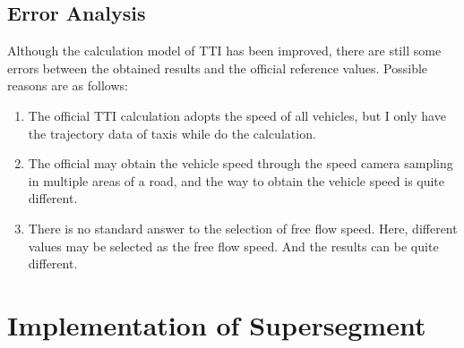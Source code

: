 \documentclass[fontset=none]{ctexart}
\theoremstyle{definition}
\theoremstyle{remark}
\begin{document}
\subsection{Error Analysis}
Although the calculation model of TTI has been improved, there are still some errors between the obtained results and the official reference values.
Possible reasons are as follows:
\begin{enumerate}
  \item The official TTI calculation adopts the speed of all vehicles, but I only have the trajectory data of taxis while do the calculation.
  \item The official may obtain the vehicle speed through the speed camera sampling in multiple areas of a road, and the way to obtain the vehicle speed is quite different.
  \item There is no standard answer to the selection of free flow speed. Here, different values may be selected as the free flow speed. And the results can be quite different.
\end{enumerate}

\clearpage
\section{Implementation of Supersegment}
\end{document}

